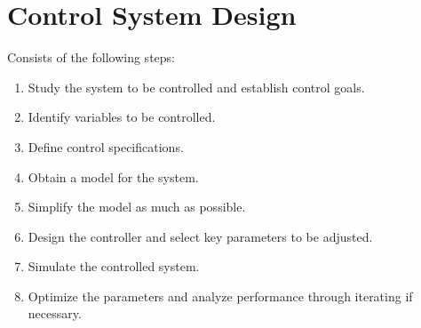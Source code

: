 \documentclass[11pt]{article}
\begin{document}
\section{Control System Design}
\label{sec:org80194aa}
Consists of the following steps:
\begin{enumerate}
\item Study the system to be controlled and establish control goals.
\item Identify variables to be controlled.
\item Define control specifications.
\item Obtain a model for the system.
\item Simplify the model as much as possible.
\item Design the controller and select key parameters to be adjusted.
\item Simulate the controlled system.
\item Optimize the parameters and analyze performance through iterating
if necessary.
\end{enumerate}
\end{document}
